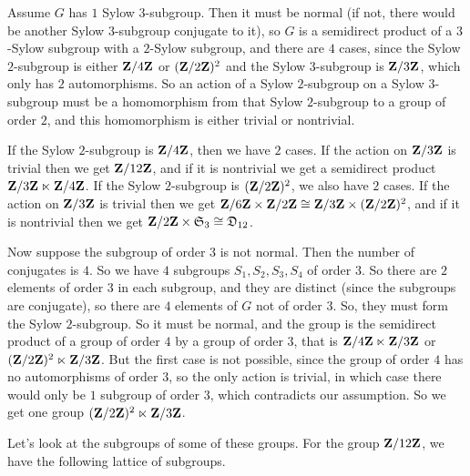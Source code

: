 \documentclass[11pt, twoside]{amsart}
\begin{document}
Assume $G$ has $1$ Sylow $3$-subgroup. Then it must be normal (if not, there would be another Sylow $3$-subgroup conjugate to it), so $G$ is a semidirect product of a $3$-Sylow subgroup with a $2$-Sylow subgroup, and there are $4$ cases, since the Sylow $2$-subgroup is either $\mathbf{Z}/4\mathbf{Z} $ or $(\mathbf{Z}/2\mathbf{Z} )^2$ and the Sylow $3$-subgroup is $\mathbf{Z}/3\mathbf{Z}$, which only has $2$ automorphisms. So an action of a Sylow $2$-subgroup on a Sylow $3$-subgroup must be a homomorphism from that Sylow $2$-subgroup to a group of order $2$, and this homomorphism is either trivial or nontrivial.  


If the Sylow $2$-subgroup is $\mathbf{Z}/4\mathbf{Z}$, then we have $2$ cases. If the action on $\mathbf{Z}/3\mathbf{Z}$ is trivial then we get $\mathbf{Z}/12\mathbf{Z}$, and if it is nontrivial we get a semidirect product $\mathbf{Z}/3\mathbf{Z} \ltimes \mathbf{Z}/4\mathbf{Z}$. If the Sylow $2$-subgroup is $(\mathbf{Z}/2\mathbf{Z})^2$, we also have $2$ cases. If the action on $\mathbf{Z}/3\mathbf{Z}$ is trivial then we get $\mathbf{Z}/6\mathbf{Z}\times\mathbf{Z}/2\mathbf{Z} \cong\mathbf{Z}/3\mathbf{Z} \times (\mathbf{Z}/2\mathbf{Z})^2$, and if it is nontrivial then we get $\mathbf{Z}/2\mathbf{Z} \times \mathfrak{S}_3 \cong \mathfrak{D}_{12}$.

Now suppose the subgroup of order $3$ is not normal. Then the number of conjugates is $4$. So we have $4$ subgroups $S_1,S_2,S_3,S_4$ of order $3$. So there are $2$ elements of order $3$ in each subgroup, and they are distinct (since the subgroups are conjugate), so there are $4$ elements of $G$ not of order $3$. So, they must form the Sylow $2$-subgroup. So it must be normal, and the group is the semidirect product of a group of order $4$ by a group of order $3$, that is $\mathbf{Z}/4\mathbf{Z} \ltimes \mathbf{Z}/3\mathbf{Z} $ or $(\mathbf{Z}/2\mathbf{Z} )^2 \ltimes \mathbf{Z}/3\mathbf{Z} $. But the first case is not possible, since the group of order $4$ has no automorphisms of order $3$, so the only action is trivial, in which case there would only be $1$ subgroup of order $3$, which contradicts our assumption. So we get one group $(\mathbf{Z}/2\mathbf{Z} )^2 \ltimes \mathbf{Z}/3\mathbf{Z} $.

Let's look at the subgroups of some of these groups. For the group $\mathbf{Z}/12\mathbf{Z}$, we have the following lattice of subgroups.
\begin{center}
\end{center}
\end{document}

